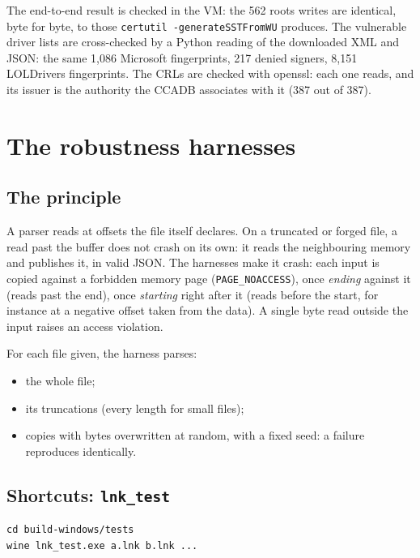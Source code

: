 \documentclass[11pt,a4paper,oneside]{report}
\begin{document}
The end-to-end result is checked in the VM: the 562 roots 
writes are identical, byte for byte, to those \texttt{certutil
-generateSSTFromWU} produces. The vulnerable driver lists are cross-checked by
a Python reading of the downloaded XML and JSON: the same 1,086 Microsoft
fingerprints, 217 denied signers, 8,151 LOLDrivers fingerprints. The CRLs
are checked with openssl: each one reads, and its issuer is the authority the
CCADB associates with it (387 out of 387).

\chapter{The robustness harnesses}\label{ch:robustesse}

\section{The principle}

A parser reads at offsets the file itself declares. On a truncated or forged
file, a read past the buffer does not crash on its own: it reads the
neighbouring memory and publishes it, in valid JSON. The harnesses make it
crash: each input is copied against a forbidden memory page
(\texttt{PAGE\_NOACCESS}), once \emph{ending} against it (reads past the end),
once \emph{starting} right after it (reads before the start, for instance at a
negative offset taken from the data). A single byte read outside the input
raises an access violation.

For each file given, the harness parses:
\begin{itemize}
  \item the whole file;
  \item its truncations (every length for small files);
  \item copies with bytes overwritten at random, with a fixed seed: a failure
    reproduces identically.
\end{itemize}

\section{Shortcuts: \texttt{lnk\_test}}

\begin{lstlisting}
cd build-windows/tests
wine lnk_test.exe a.lnk b.lnk ...
\end{lstlisting}
\end{document}
